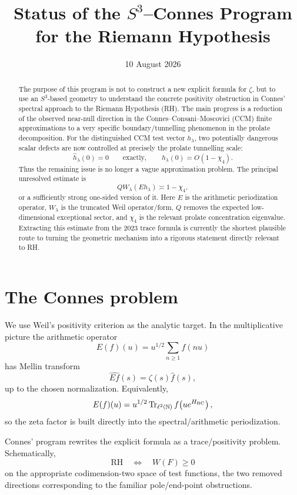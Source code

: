 \documentclass[11pt]{article}
\title{Status of the \(S^3\)--Connes Program for the Riemann Hypothesis}
\date{10 August 2026}
\begin{document}
\maketitle

\begin{abstract}
The purpose of this program is not to construct a new explicit formula for
\(\zeta\), but to use an \(S^3\)-based geometry to understand the concrete
positivity obstruction in Connes' spectral approach to the Riemann
Hypothesis (RH).  The main progress is a reduction of the observed
near-null direction in the Connes--Consani--Moscovici (CCM) finite
approximations to a very specific boundary/tunnelling phenomenon in the
prolate decomposition.  For the distinguished CCM test vector
\(h_\lambda\), two potentially dangerous scalar defects are now controlled
at precisely the prolate tunnelling scale:
\[
        \widehat h_\lambda(0)=0
        \qquad\text{exactly},
        \qquad
        h_\lambda(0)=O(1-\chi_4).
\]
Thus the remaining issue is no longer a vague approximation problem.
The principal unresolved estimate is
\[
        QW_\lambda(Eh_\lambda)\asymp 1-\chi_4,
\]
or a sufficiently strong one-sided version of it.  Here \(E\) is the
arithmetic periodization operator, \(W_\lambda\) is the truncated Weil
operator/form, \(Q\) removes the expected low-dimensional exceptional
sector, and \(\chi_4\) is the relevant prolate concentration eigenvalue.
Extracting this estimate from the 2023 trace formula is currently the
shortest plausible route to turning the geometric mechanism into a
rigorous statement directly relevant to RH.
\end{abstract}

\section{The Connes problem}

We use Weil's positivity criterion as the analytic target.  In the
multiplicative picture the arithmetic operator
\[
        E(f)(u)
        =
        u^{1/2}\sum_{n\geq1}f(nu)
\]
has Mellin transform
\[
        \widehat{Ef}(s)=\zeta(s)\widehat f(s),
\]
up to the chosen normalization.  Equivalently,
\[
        E(f)(u)
        =
        u^{1/2}\operatorname{Tr}_{\ell^2(\mathbb N)}
        f\!\left(ue^{H_{\rm BC}}\right),
\]
so the zeta factor is built directly into the spectral/arithmetic
periodization.

Connes' program rewrites the explicit formula as a trace/positivity
problem.  Schematically,
\[
        \mathrm{RH}
        \quad\Longleftrightarrow\quad
        W(F)\geq0
\]
on the appropriate codimension-two space of test functions, the two
removed directions corresponding to the familiar pole/end-point
obstructions.
\end{document}
